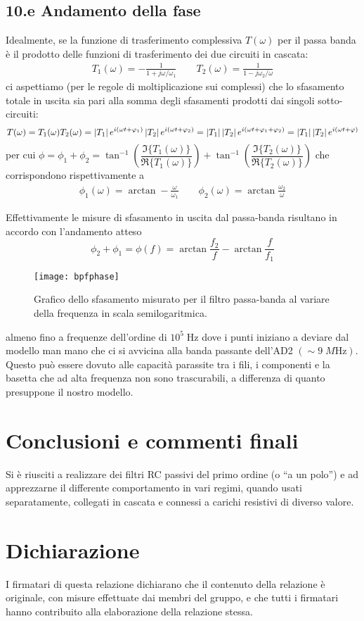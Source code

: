 \documentclass[10pt,a4paper]{article}
\begin{document}
\subsection*{10.e Andamento della fase}
Idealmente, se la funzione di trasferimento complessiva $T(\omega)$ per il
passa banda è il prodotto delle funzioni di trasferimento dei due circuiti in
cascata:
\begin{align*}
T_1(\omega) = -\frac{1}{1 + j \omega/\omega_1} \qquad
T_2(\omega) = \frac{1}{1 - j \omega_2/\omega}
\end{align*}
ci aspettiamo (per le regole di moltiplicazione sui complessi) che lo
sfasamento totale in uscita sia pari alla somma degli sfasamenti prodotti dai
singoli sotto-circuiti:
\[
T(\omega) = T_1(\omega) T_2(\omega) =
\left| T_1 \right| e^{i (\omega t + \varphi_1)} \left| T_2 \right| e^{i (\omega t + \varphi_2)} =
\left| T_1 \right| \left| T_2 \right| e^{i (\omega t + \varphi_1 + \varphi_2)} =
\left| T_1 \right| \left| T_2 \right| e^{i (\omega t + \varphi)}
\]
per cui $\phi = \phi_1 + \phi_2 =
\tan^{-1} \left( \dfrac{\Im{\{T_1(\omega)\}}}{\Re{\{T_1(\omega)\}}} \right) +
\tan^{-1} \left( \dfrac{\Im{\{T_2(\omega)\}}}{\Re{\{T_2(\omega)\}}} \right)$
che corrispondono rispettivamente a
\begin{align*}
\phi_1(\omega) = \arctan - \frac{\omega}{\omega_1} \qquad
\phi_2(\omega) = \arctan \frac{\omega_2}{\omega}
\end{align*}

Effettivamente le misure di sfasamento in uscita dal passa-banda risultano
in accordo con l'andamento atteso
\begin{equation}
\phi_2 + \phi_1 = \phi(f) = \arctan{\frac{f_2}{f}} - \arctan{\frac{f}{f_1}}
\end{equation}
\begin{figure}[htb]
\centering
\texttt{[image: bpfphase]}
\caption{Grafico dello sfasamento misurato per il filtro passa-banda al
variare della frequenza in scala semilogaritmica.}
\end{figure}
almeno fino a frequenze dell'ordine di $10^5 \; \si{\Hz}$ dove i punti
iniziano a deviare dal modello man mano che ci si avvicina alla banda
passante dell'AD2 $(\sim 9 \; \si{M\Hz})$. Questo può essere dovuto alle
capacità parassite tra i fili, i componenti e la basetta che ad alta
frequenza non sono trascurabili, a differenza di quanto presuppone il nostro
modello.
\fi

\section*{Conclusioni e commenti finali}
Si è riusciti a realizzare dei filtri RC passivi del primo ordine
(o ``a un polo'') e ad apprezzarne il differente comportamento in vari
regimi, quando usati separatamente, collegati in cascata e connessi a
carichi resistivi di diverso valore.

\section*{Dichiarazione}
I firmatari di questa relazione dichiarano che il contenuto della relazione \`e 
originale, con misure effettuate dai membri del gruppo, e che tutti i firmatari 
hanno contribuito alla elaborazione della relazione stessa.
\end{document}
